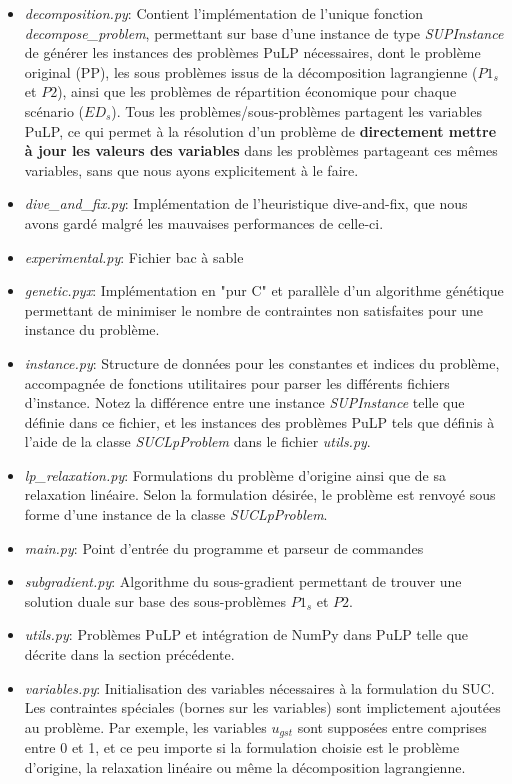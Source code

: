 \begin{itemize}
  \item \textit{decomposition.py}: Contient l'implémentation de l'unique fonction \textit{decompose\_problem}, permettant
  sur base d'une instance de type \textit{SUPInstance} de générer les instances des problèmes PuLP
  nécessaires, dont le problème original (PP), les sous problèmes issus de la décomposition lagrangienne ($P1_s$ et $P2$),
  ainsi que les problèmes de répartition économique pour chaque scénario ($ED_s$). Tous les problèmes/sous-problèmes
  partagent les variables PuLP, ce qui permet à la résolution d'un problème de \textbf{directement mettre à jour les valeurs
  des variables} dans les problèmes partageant ces mêmes variables, sans que nous ayons explicitement à le faire.
  \item \textit{dive\_and\_fix.py}: Implémentation de l'heuristique dive-and-fix, que nous avons gardé malgré les mauvaises
  performances de celle-ci.
  \item \textit{experimental.py}: Fichier bac à sable
  \item \textit{genetic.pyx}: Implémentation en "pur C" et parallèle d'un algorithme génétique permettant de minimiser
  le nombre de contraintes non satisfaites pour une instance du problème.
  \item \textit{instance.py}: Structure de données pour les constantes et indices du problème, accompagnée de fonctions
  utilitaires pour parser les différents fichiers d'instance. Notez la différence entre une instance \textit{SUPInstance}
  telle que définie dans ce fichier, et les instances des problèmes PuLP tels que définis à l'aide de la classe
  \textit{SUCLpProblem} dans le fichier \textit{utils.py}.
  \item \textit{lp\_relaxation.py}: Formulations du problème d'origine ainsi que de sa relaxation linéaire. Selon
  la formulation désirée, le problème est renvoyé sous forme d'une instance de la classe \textit{SUCLpProblem}.
  \item \textit{main.py}: Point d'entrée du programme et parseur de commandes
  \item \textit{subgradient.py}: Algorithme du sous-gradient permettant de trouver une solution duale sur base
  des sous-problèmes $P1_s$ et $P2$.
  \item \textit{utils.py}: Problèmes PuLP et intégration de NumPy dans PuLP telle que décrite dans la section précédente.
  \item \textit{variables.py}: Initialisation des variables nécessaires à la formulation du SUC. Les contraintes spéciales
  (bornes sur les variables) sont implictement ajoutées au problème. Par exemple, les variables $u_{gst}$ sont supposées
  entre comprises entre 0 et 1, et ce peu importe si la formulation choisie est le problème d'origine, la relaxation
  linéaire ou même la décomposition lagrangienne.
\end{itemize}